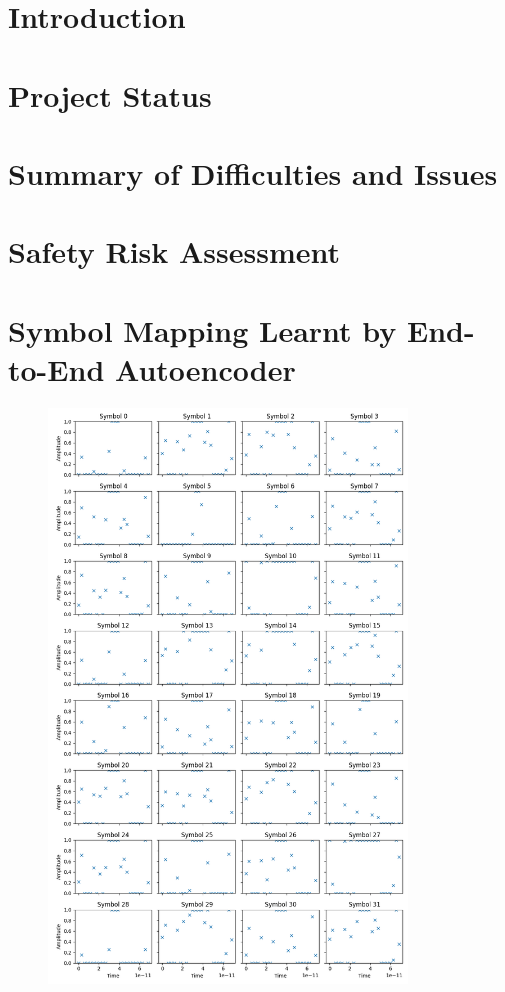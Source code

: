 \documentclass[a4paper,12pt]{article}
\begin{document}
	
	
	
	\section{Introduction}
	\label{sec:introduction}
	
	
	\section{Project Status}
	\label{sec:project_status}
	
	
	\section{Summary of Difficulties and Issues}
	\label{sec:difficulties}
	
	
	\printbibliography
	
	\newpage
	\appendix
	\appendixpage

	\section{Safety Risk Assessment}
	\label{app:safety_risk_assessment}
	
		
	
	
	\section{Symbol Mapping Learnt by End-to-End Autoencoder}
	\label{app:learnt_symbol_mapping}
	
	\begin{figure}[H]
		\centering
		\includegraphics[width=0.85\textwidth]{learnt_symbol_mapping.png}
		\caption{}
		\label{fig:learnt_symbol_mapping}	
	\end{figure}
	
\end{document}
